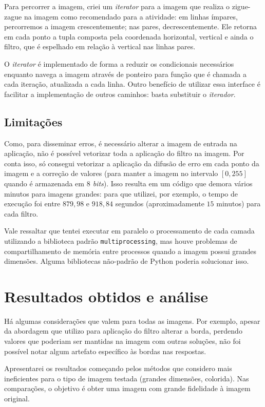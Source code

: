 \documentclass[brazilian,a4paper,twocolumn]{article}
\begin{document}
        Para percorrer a imagem, criei um \textit{iterator} para a imagem que realiza o zigue-zague na imagem como recomendado para a atividade: em linhas ímpares, percorremos a imagem crescentemente; nas pares, decrescentemente. Ele retorna em cada ponto a tupla composta pela coordenada horizontal, vertical e ainda o filtro, que é espelhado em relação à vertical nas linhas pares.

        O \textit{iterator} é implementado de forma a reduzir os condicionais necessários enquanto navega a imagem através de ponteiro para função que é chamada a cada iteração, atualizada a cada linha. Outro benefício de utilizar essa interface é facilitar a implementação de outros caminhos: basta substituir o \textit{iterador}.

    \subsection{Limitações}

        Como, para disseminar erros, é necessário alterar a imagem de entrada na aplicação, não é possível vetorizar toda a aplicação do filtro na imagem. Por conta isso, só consegui vetorizar a aplicação da difusão de erro em cada ponto da imagem e a correção de valores (para manter a imagem no intervalo $[0, 255]$ quando é armazenada em \textit{$8$ bits}). Isso resulta em um código que demora vários minutos para imagens grandes: para que utilizei, por exemplo, o tempo de execução foi entre $879,98$ e $918,84$ segundos (aproximadamente $15$ minutos) para cada filtro.

        Vale ressaltar que tentei executar em paralelo o processamento de cada camada utilizando a biblioteca padrão \texttt{multiprocessing}, mas houve problemas de compartilhamento de memória entre processos quando a imagem possui grandes dimensões. Alguma bibliotecas não-padrão de Python poderia solucionar isso.


\section{Resultados obtidos e análise}

    Há algumas considerações que valem para todas as imagens. Por exemplo, apesar da abordagem que utilizo para aplicação do filtro alterar a borda, perdendo valores que poderiam ser mantidas na imagem com outras soluções, não foi possível notar algum artefato específico às bordas nas respostas.

    Apresentarei os resultados começando pelos métodos que considero mais ineficientes para o tipo de imagem testada (grandes dimensões, colorida). Nas comparações, o objetivo é obter uma imagem com grande fidelidade à imagem original.
\end{document}
